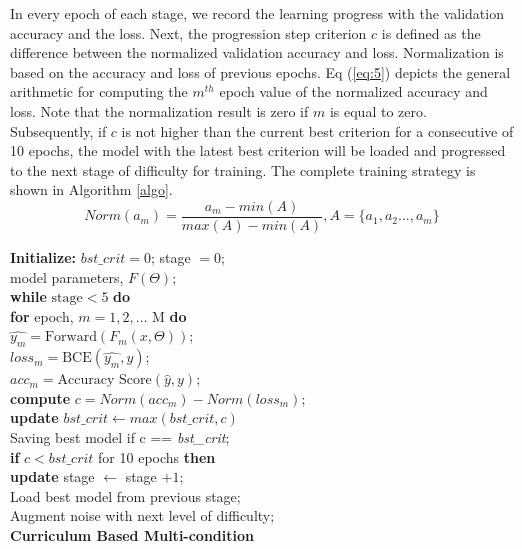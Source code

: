 \documentclass{article}
\newcommand\tab[1][12pt]{\hspace*{#1}}
\begin{document}
In every epoch of each stage, we record the learning progress with the validation accuracy and the loss. Next, the progression step criterion $c$ is defined as the difference between the normalized validation accuracy and loss. Normalization is based on the accuracy and loss of previous epochs. Eq (\ref{eq:5}) depicts the general arithmetic for computing the $m^{th}$ epoch value of the normalized accuracy and loss. Note that the normalization result is zero if $m$ is equal to zero. Subsequently, if $c$ is not higher than the current best criterion for a consecutive of 10 epochs, the model with the latest best criterion will be loaded and progressed to the next stage of difficulty for training. The 
complete training strategy is shown in Algorithm \ref{algo}. \begin{equation}
\label{eq:5}
Norm(a_m)=\frac{a_m-min(A)}{max(A)-min(A)}, A=\{a_1,a_2...,a_m\} 
\end{equation}   












\begin{algorithm}[ht]
\nl\textbf{Initialize:} $bst\_crit = 0$; stage $= 0$;\\
\tab\tab\tab model parameters, $F(\Theta)$; \\
\nl \textbf{while} $\text{stage} < 5$ \textbf{do} \\
    \nl \tab \textbf{for} epoch, $m = 1, 2, \ldots$ M \textbf{do}\\
    \nl \tab \tab $\hat{y_m} = \text{Forward}(F_m(x, \Theta))$; \\
    \nl \tab \tab $loss_m = \text{BCE}( \hat{y_m}, y)$;  \\
    \nl \tab \tab $acc_m = \text{Accuracy Score}(\hat{y}, y)$; \\
    \nl \tab \tab \textbf{compute} $c = Norm(acc_m)-Norm(loss_m)$; \\
    \nl \tab \tab \textbf{update} $bst\_crit \leftarrow max(bst\_crit, c)$ \\
    \nl \tab \tab Saving best model if c == \textit{bst\_crit}; \\
    \nl \tab \tab \textbf{if} $c < bst\_crit$ for 10 epochs \textbf{then} \\
    \nl \tab \tab \tab \textbf{update} stage $\leftarrow$ stage $+ 1$;\\
    \nl \tab \tab \tab Load best model from previous stage;\\
    \nl \tab \tab \tab Augment noise with next level of difficulty; \\
\caption{\bf Curriculum Based Multi-condition} 
\label{algo}
\end{algorithm}
\end{document}
